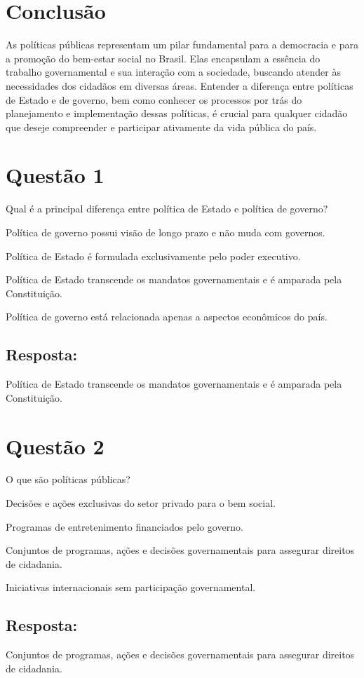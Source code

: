 \documentclass[
   article,       
   12pt,          
   oneside,       
   a4paper,       
   english,       
   brazil,        
   sumario=tradicional
   ]{abntex2}
\begin{document}
\section{Conclusão}
As políticas públicas representam um pilar fundamental para a democracia e para a promoção do bem-estar social no Brasil. Elas encapsulam a essência do trabalho governamental e sua interação com a sociedade, buscando atender às necessidades dos cidadãos em diversas áreas. Entender a diferença entre políticas de Estado e de governo, bem como conhecer os processos por trás do planejamento e implementação dessas políticas, é crucial para qualquer cidadão que deseje compreender e participar ativamente da vida pública do país.
\section{Questão 1}
Qual é a principal diferença entre política de Estado e política de governo?
\itemize
    \item Política de governo possui visão de longo prazo e não muda com governos.
    \item Política de Estado é formulada exclusivamente pelo poder executivo.
    \item Política de Estado transcende os mandatos governamentais e é amparada pela Constituição.
    \item Política de governo está relacionada apenas a aspectos econômicos do país.
\subsection{Resposta:} Política de Estado transcende os mandatos governamentais e é amparada pela Constituição.
\section{Questão 2}
O que são políticas públicas?
\itemize
    \item Decisões e ações exclusivas do setor privado para o bem social.
    \item Programas de entretenimento financiados pelo governo.
    \item Conjuntos de programas, ações e decisões governamentais para assegurar direitos de cidadania.
    \item Iniciativas internacionais sem participação governamental.
\subsection{Resposta:} Conjuntos de programas, ações e decisões governamentais para assegurar direitos de cidadania.
\end{document}
